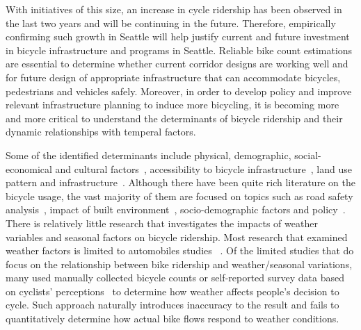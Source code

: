 \documentclass [11pt, proquest] {uwthesis}[2015/03/03]
\begin{document}
With initiatives of this size, an increase in cycle ridership has been observed in the last two years and will be continuing in the future. Therefore, empirically confirming such growth in Seattle will help justify current and future investment in bicycle infrastructure and programs in Seattle. Reliable bike count estimations are essential to determine whether current corridor designs are working well and for future design of appropriate infrastructure that can accommodate bicycles, pedestrians and vehicles safely. 
Moreover, in order to develop policy and improve relevant infrastructure planning to induce more bicycling, it is becoming more and more critical to understand the determinants of bicycle ridership and their dynamic relationships with temperal factors. 

Some of the identified determinants include physical, demographic, social-economical and cultural factors~\cite{Xing10,Pucher10,Krizek09}, accessibility to bicycle infrastructure~\cite{Voros07}, land use pattern and infrastructure~\cite{Dunlap15}. Although there have been quite rich literature on the bicycle usage, the vast majority of them are focused on topics such as road safety analysis~\cite{Kim07}, impact of built environment~\cite{Pucher10}, socio-demographic factors and policy~\cite{Garrard08,Xing10}. There is relatively little research that investigates the impacts of weather variables and seasonal factors on bicycle ridership. Most research that examined weather factors is limited to automobiles studies%
~\cite{Miranda-Moreno:2011aa,Rose:2011aa,Nosal:2014aa,Rose07}. Of the limited studies that do focus on the relationship between bike ridership and weather/seasonal variations, many used manually collected bicycle counts or self-reported survey data based on cyclists' perceptions~\cite{Nankervis99,Winters07,Richardson00,Richardson06} to determine how weather affects people's decision to cycle. Such approach naturally introduces inaccuracy to the result and fails to quantitatively determine how actual bike flows respond to weather conditions. 


\end{document}
